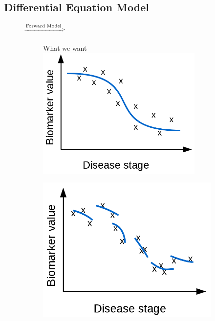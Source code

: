 \subsection{Differential Equation Model}
\label{sec:bckDem}


\begin{figure}[h]
 \centering
 
 \par{\huge $\xRightarrow{\text{Forward Model}}$}
 
 \begin{subfigure}{0.3\textwidth}
    \centering
    What we want\\
    \vspace{1em}
    \includegraphics[width=0.90\textwidth]{images/demNewFigs/fig1}
    \vspace{1em}
 \end{subfigure}
 \begin{subfigure}{0.3\textwidth}
     \centering
     \vspace{1em}
     \includegraphics[width=\textwidth]{images/demNewFigs/fig2}

\end{subfigure}
\end{figure}
